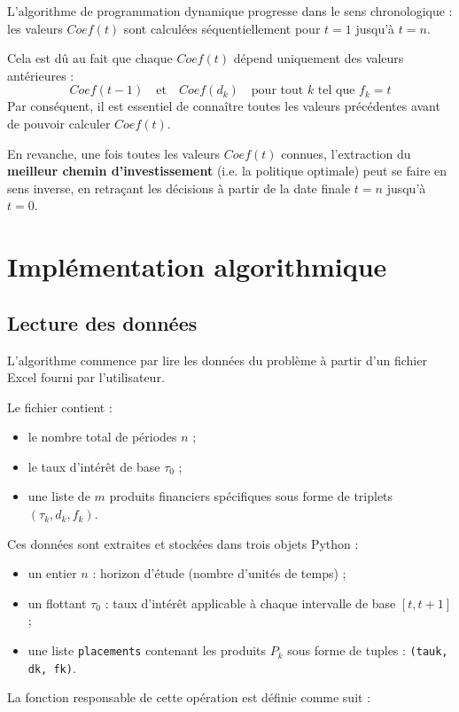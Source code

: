 \documentclass[a4paper,11pt]{article}
\begin{document}
    L’algorithme de programmation dynamique progresse dans le sens chronologique : les valeurs $Coef(t)$ sont calculées séquentiellement pour $t = 1$ jusqu’à $t = n$.

    Cela est dû au fait que chaque $Coef(t)$ dépend uniquement des valeurs antérieures :
    \[
    Coef(t-1) \quad \text{et} \quad Coef(d_k) \quad \text{pour tout } k \text{ tel que } f_k = t
    \]
Par conséquent, il est essentiel de connaître toutes les valeurs précédentes avant de pouvoir calculer $Coef(t)$.

En revanche, une fois toutes les valeurs $Coef(t)$ connues, l’extraction du \textbf{meilleur chemin d’investissement} (i.e. la politique optimale) peut se faire en sens inverse, en retraçant les décisions à partir de la date finale $t = n$ jusqu’à $t = 0$.

    \section{Implémentation algorithmique}
    \subsection{Lecture des données}

L’algorithme commence par lire les données du problème à partir d’un fichier Excel fourni par l’utilisateur.

Le fichier contient :
\begin{itemize}
    \item le nombre total de périodes $n$ ;
    \item le taux d’intérêt de base $\tau_0$ ;
    \item une liste de $m$ produits financiers spécifiques sous forme de triplets $(\tau_k, d_k, f_k)$.
\end{itemize}

Ces données sont extraites et stockées dans trois objets Python :
\begin{itemize}
    \item un entier $n$ : horizon d’étude (nombre d’unités de temps) ;
    \item un flottant $\tau_0$ : taux d’intérêt applicable à chaque intervalle de base $[t, t+1]$ ;
    \item une liste \texttt{placements} contenant les produits $P_k$ sous forme de tuples : \texttt{(tauk, dk, fk)}.
\end{itemize}

La fonction responsable de cette opération est définie comme suit :
\end{document}
